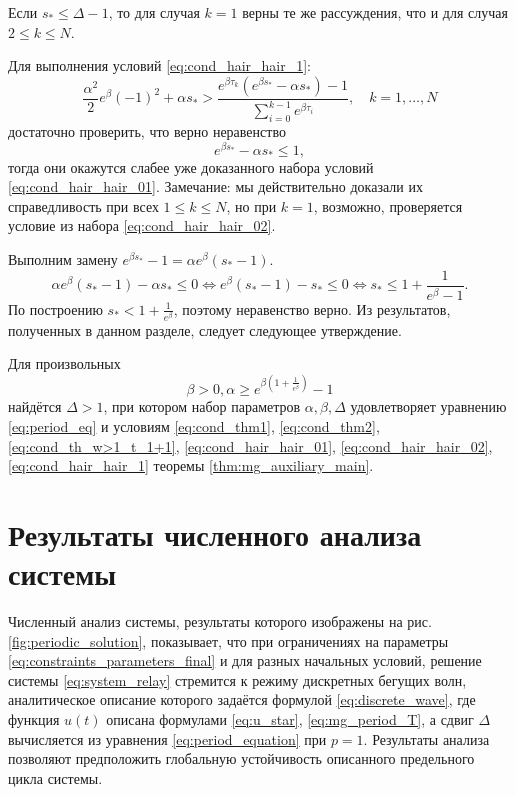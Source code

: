 Если $s_* \leqslant \Delta - 1$, то для случая $k = 1$ верны те же рассуждения, что и для случая $2 \leqslant k \leqslant N$.

Для выполнения условий \eqref{eq:cond_hair_hair_1}:
\[
\frac{\alpha^2}{2}e^\beta(-1)^2+\alpha s_*>\frac{e^{\beta \tau_k}(e^{\beta s_*}-\alpha s_*)-1}{\sum_{i=0}^{k-1}e^{\beta \tau_i}},\quad k = 1,\ldots, N
\]
достаточно проверить, что верно неравенство
\[
e^{\beta s_*}-\alpha s_* \leqslant 1,
\]
тогда они окажутся слабее уже доказанного набора условий \eqref{eq:cond_hair_hair_01}. Замечание: мы действительно доказали их справедливость при всех $1 \leqslant k \leqslant N$, но при $k = 1$, возможно, проверяется условие из набора \eqref{eq:cond_hair_hair_02}.

Выполним замену $e^{\beta s_*} - 1 = \alpha e^\beta (s_* - 1)$.
%
\[
\alpha e^{\beta}(s_* - 1) - \alpha s_* \leqslant 0 \Leftrightarrow e^{\beta}(s_* - 1) - s_* \leqslant 0 \Leftrightarrow s_* \leqslant 1 + \frac{1}{e^{\beta} - 1}.
\]
%
По построению $s_* < 1 + \frac{1}{e^{\beta}}$, поэтому неравенство верно.
%
Из результатов, полученных в данном разделе, следует следующее утверждение.
%
\begin{theorem}
	\label{thm:relay_main}
	Для произвольных 
	\begin{equation}
		\label{eq:constraints_parameters_final}
		\beta > 0, \alpha \geq e^{\beta\left(1 + \frac{1}{e^{\beta}}\right)} - 1
	\end{equation}
	найдётся $\Delta > 1$, при котором набор параметров $\alpha, \beta, \Delta$ удовлетворяет уравнению \eqref{eq:period_eq} и условиям \eqref{eq:cond_thm1}, \eqref{eq:cond_thm2}, \eqref{eq:cond_th_w>1_t_1+1}, \eqref{eq:cond_hair_hair_01}, \eqref{eq:cond_hair_hair_02}, \eqref{eq:cond_hair_hair_1} теоремы \ref{thm:mg_auxiliary_main}.
\end{theorem}


\section{Результаты численного анализа системы}\label{sec:ch2/sect4}
%
Численный анализ системы, результаты которого изображены на рис. \ref{fig:periodic_solution}, показывает, что при ограничениях на параметры \eqref{eq:constraints_parameters_final} и для разных начальных условий, решение системы \eqref{eq:system_relay} стремится к режиму дискретных бегущих волн, аналитическое описание которого задаётся формулой \eqref{eq:discrete_wave}, где функция $u(t)$ описана формулами \eqref{eq:u_star}, \eqref{eq:mg_period_T}, а сдвиг $\Delta$ вычисляется из уравнения \eqref{eq:period_equation} при $p = 1$. Результаты анализа позволяют предположить глобальную устойчивость описанного предельного цикла системы.

